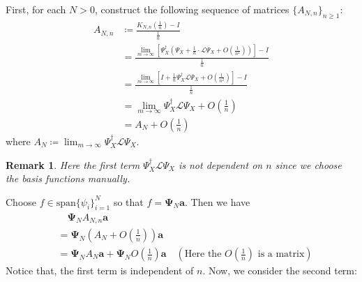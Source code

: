 \documentclass{article}[11]
\newtheorem*{remark}{Remark}
\begin{document}
	First, for each $N>0$, construct the following sequence of matrices $\{A_{N,n}\}_{n\geq 1}$:
	\begin{align*}
		A_{N,n} &\coloneqq \frac{ K_{N,n}\left( \tfrac{1}{n} \right)  - I }{\tfrac{1}{n}} \\
		&= \frac{ \lim_{m\to\infty} \left[\Psi_X^{\dagger}\left(\Psi_X + \tfrac{1}{n} \cdot \mathcal{L}\Psi_X + O(\tfrac{1}{n^2})\right)\right]  - I }{\tfrac{1}{n}} \\
		&= \frac{ \lim_{m\to\infty} \left[I + \tfrac{1}{n}\Psi_X^{\dagger}\mathcal{L}\Psi_X + O(\tfrac{1}{n^2})\right]  - I }{\tfrac{1}{n}} \\
		&= \lim_{m\to\infty} \Psi_X^{\dagger}\mathcal{L}\Psi_X + O(\tfrac{1}{n}) \\
		&= A_N + O(\tfrac{1}{n})
	\end{align*}
	where $A_N \coloneqq \lim_{m\to\infty} \Psi_X^{\dagger}\mathcal{L}\Psi_X$.
	\begin{remark}
		Here the first term $\Psi_X^{\dagger}\mathcal{L}\Psi_X$ is not dependent on $n$ since we choose the basis functions manually.
	\end{remark}
	Choose $f \in \textrm{span}\{\psi_i\}_{i=1}^N$ so that $f = \mathbf{\Psi}_N\mathbf{a}$. Then we have
	\begin{align*}
		&\quad \mathbf{\Psi}_N A_{N,n}\mathbf{a} \\
		&= \mathbf{\Psi}_N\left(A_N + O(\tfrac{1}{n})\right)\mathbf{a} \\
		&= \mathbf{\Psi}_N A_N \mathbf{a} + \mathbf{\Psi}_N O(\tfrac{1}{n})\mathbf{a} \quad (\text{Here the $O(\tfrac{1}{n})$ is a matrix})
	\end{align*}
	Notice that, the first term is independent of $n$. Now, we consider the second term:
\end{document}
